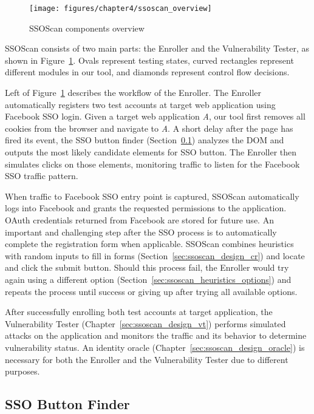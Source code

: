 \begin{figure}[hbt]
\centering
\texttt{[image: figures/chapter4/ssoscan\_overview]}
\caption{SSOScan components overview}
\label{fig:ssoscan_overview}
\end{figure}

SSOScan consists of two main parts: the Enroller and the Vulnerability Tester, as shown in Figure~\ref{fig:ssoscan_overview}.  Ovals represent testing states, curved rectangles represent different modules in our tool, and diamonds represent control flow decisions.  

Left of Figure~\ref{fig:ssoscan_overview} describes the workflow of the Enroller.  The Enroller automatically registers two test accounts at target web application using Facebook SSO login.  Given a target web application \emph{A}, our tool first removes all cookies from the browser and navigate to \emph{A}.  A short delay after the page has fired its  event, the SSO button finder (Section~\ref{sec:ssoscan_design_bf}) analyzes the DOM and outputs the most likely candidate elements for SSO button.  The Enroller then simulates clicks on those elements, monitoring traffic to listen for the Facebook SSO traffic pattern.

When traffic to Facebook SSO entry point is captured, SSOScan automatically logs into Facebook and grants the requested permissions to the application.  OAuth credentials returned from Facebook are stored for future use.  An important and challenging step after the SSO process is to automatically complete the registration form when applicable.  SSOScan combines heuristics with random inputs to fill in forms (Section~\ref{sec:ssoscan_design_cr}) and locate and click the submit button.  Should this process fail, the Enroller would try again using a different option (Section~\ref{sec:ssoscan_heuristics_options}) and repeats the process until success or giving up after trying all available options.  

After successfully enrolling both test accounts at target application, the Vulnerability Tester (Chapter~\ref{sec:ssoscan_design_vt}) performs simulated attacks on the application and monitors the traffic and its behavior to determine vulnerability status.  An identity oracle (Chapter~\ref{sec:ssoscan_design_oracle}) is necessary for both the Enroller and the Vulnerability Tester due to different purposes.

\subsection{SSO Button Finder}
\label{sec:ssoscan_design_bf}

